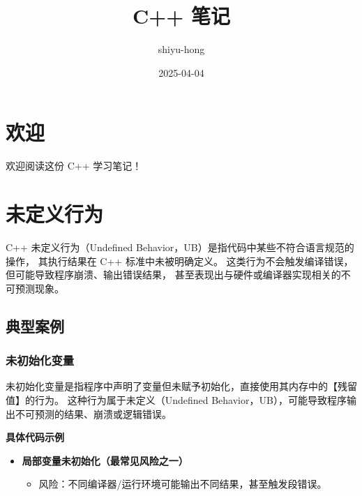 \documentclass[
  10pt,
  a4paper,
  UTF8,twoside]{book}
\title{C++ 笔记}
\author{shiyu-hong}
\date{2025-04-04}
\providecommand{\tightlist}{%
  \setlength{\itemsep}{0pt}\setlength{\parskip}{0pt}}
\begin{document}
\maketitle

{
\setcounter{tocdepth}{1}
\tableofcontents
}
\chapter*{欢迎}\label{welcome}

欢迎阅读这份 C++ 学习笔记！

\chapter{未定义行为}\label{note01-undefined-behavior}

C++ 未定义行为（Undefined Behavior，UB）是指代码中某些不符合语言规范的操作， 其执行结果在 C++ 标准中未被明确定义。 这类行为不会触发编译错误，但可能导致程序崩溃、输出错误结果， 甚至表现出与硬件或编译器实现相关的不可预测现象。

\section{典型案例}\label{specific-case}

\subsection{未初始化变量}\label{uninitialized-variable}

未初始化变量是指程序中声明了变量但未赋予初始化，直接使用其内存中的【残留值】的行为。 这种行为属于未定义（Undefined Behavior，UB），可能导致程序输出不可预测的结果、崩溃或逻辑错误。

\textbf{具体代码示例}

\begin{itemize}
\tightlist
\item
  \textbf{局部变量未初始化（最常见风险之一）}

  \begin{itemize}
  \tightlist
  \item
    风险：不同编译器/运行环境可能输出不同结果，甚至触发段错误。
  \end{itemize}
\end{itemize}
\end{document}
